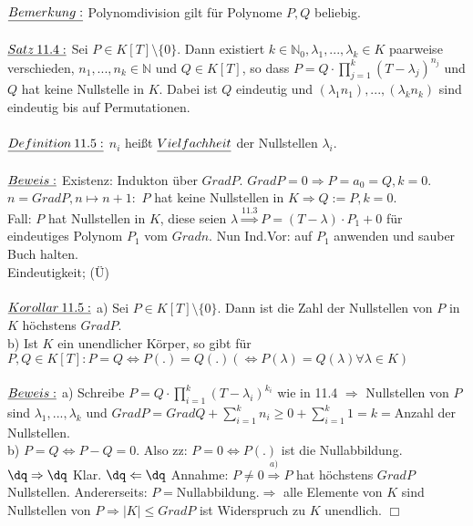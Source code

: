 \documentclass[fleqn, a4paper, 11pt]{scrartcl}
\newcommand{\NN}{\mathbb{N}}
\theoremstyle{definition}
\begin{document}
\\
$\uline{Bemerkung:}$ Polynomdivision gilt für Polynome $P,Q$ beliebig.\\
\\
$\uline{Satz\:11.4:}$ Sei $P\in K[T]\setminus\{0\}$. Dann existiert $k\in\NN_0,\lambda_1,...,\lambda_k\in K$ paarweise verschieden, $n_1,...,n_k\in\NN$ und $Q\in K[T]$, so dass $P=Q\cdot\prod_{j=1}^k (T-\lambda_j)^{n_j}$ und $Q$ hat keine Nullstelle in $K$. Dabei ist $Q$ eindeutig und $(\lambda_1 n_1),...,(\lambda_k n_k)$ sind eindeutig bis auf Permutationen.\\
\\
$\uline{Definition\:11.5:}$ $n_i$ heißt $\uline{Vielfachheit}$ der Nullstellen $\lambda_i$.\\
\\
$\uline{Beweis:}$ Existenz: Indukton über $Grad P$. $Grad P=0\Rightarrow P=a_0=Q,k=0$. $n=Grad P,n\mapsto n+1:$ $P$ hat keine Nullstellen in $K\Rightarrow Q:=P,k=0$.\\
Fall: $P$ hat Nullstellen in $K$, diese seien $\lambda\stackrel{11.3}{\Rightarrow}P=(T-\lambda)\cdot P_1 +0$ für eindeutiges Polynom $P_1$ vom $Grad n$. Nun Ind.Vor: auf $P_1$ anwenden und sauber \dq Buch halten\dq.\\
Eindeutigkeit; (\"U)\\
\\
$\uline{Korollar\:11.5:}$ a) Sei $P\in K[T]\setminus\{0\}$. Dann ist die Zahl der Nullstellen von $P$ in $K$ höchstens $Grad P$.\\
b) Ist $K$ ein unendlicher Körper, so gibt für $P,Q\in K[T]:P=Q\Leftrightarrow P(.)=Q(.)(\Leftrightarrow P(\lambda)=Q(\lambda) \forall\lambda\in K)$\\
\\
$\uline{Beweis:}$ a) Schreibe $P=Q\cdot\prod_{i=1}^k (T-\lambda_i)^{k_i}$ wie in 11.4 $\Rightarrow$ Nullstellen von $P$ sind $\lambda_1,...,\lambda_k$ und $Grad P=Grad Q+\sum\limits_{i=1}^k n_i\geq 0+\sum\limits_{i=1}^k 1=k=$Anzahl der Nullstellen.\\
b) $P=Q\Leftrightarrow P-Q=0$. Also zz: $P=0\Leftrightarrow P(.)$ ist die Nullabbildung.\\
$\dq\Rightarrow\dq$ Klar. $\dq\Leftarrow\dq$ Annahme: $P\neq 0\stackrel{a)}{\Rightarrow} P$ hat höchstens $Grad P$ Nullstellen. Andererseits: $P=$Nullabbildung.$\Rightarrow$ alle Elemente von $K$ sind Nullstellen von $P\Rightarrow |K|\leq Grad P$ ist Widerspruch zu $K$ unendlich. \hfill $\Box$\\
\\
\end{document}
